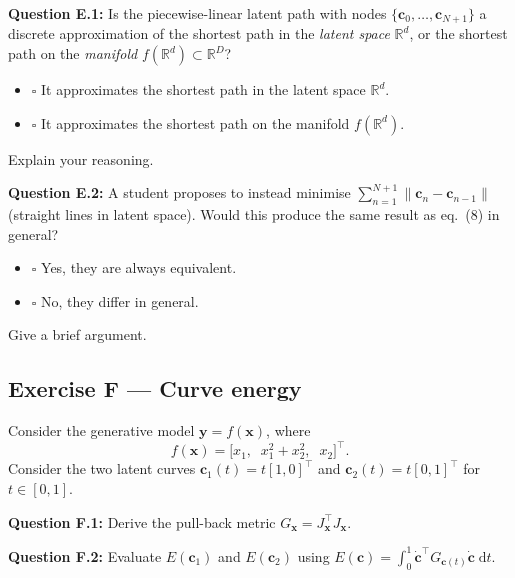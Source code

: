 \documentclass[12pt,a4paper]{article}
\begin{document}
\textbf{Question E.1:} Is the piecewise-linear latent path with nodes
$\{\mathbf{c}_0,\ldots,\mathbf{c}_{N+1}\}$ a discrete approximation of the shortest
path in the \emph{latent space} $\mathbb{R}^d$, or the shortest path on the
\emph{manifold} $f(\mathbb{R}^d)\subset\mathbb{R}^D$?

\begin{itemize}[noitemsep,label={}]
  \item[\textbf{A}] $\square$ \quad It approximates the shortest path in the latent space $\mathbb{R}^d$.
  \item[\textbf{B}] $\square$ \quad It approximates the shortest path on the manifold $f(\mathbb{R}^d)$.
\end{itemize}

Explain your reasoning.

\vspace{3cm}

\textbf{Question E.2:} A student proposes to instead minimise
$\sum_{n=1}^{N+1}\|{\mathbf{c}_n-\mathbf{c}_{n-1}}\|$ (straight lines in latent space).
Would this produce the same result as eq.~(8) in general?

\begin{itemize}[noitemsep,label={}]
  \item[\textbf{A}] $\square$ \quad Yes, they are always equivalent.
  \item[\textbf{B}] $\square$ \quad No, they differ in general.
\end{itemize}

Give a brief argument.

\vspace{3cm}

\newpage
\subsection*{Exercise F --- Curve energy}

Consider the generative model $\mathbf{y}=f(\mathbf{x})$, where
\[
  f(\mathbf{x}) = \bigl[x_1,\;\; x_1^2 + x_2^2,\;\; x_2\bigr]^\top. \tag{9}
\]
Consider the two latent curves $\mathbf{c}_1(t)=t[1,0]^\top$ and $\mathbf{c}_2(t)=t[0,1]^\top$
for $t\in[0,1]$.

\textbf{Question F.1:} Derive the pull-back metric $G_{\mathbf{x}}=J_{\mathbf{x}}^\top J_{\mathbf{x}}$.

\vspace{5cm}

\textbf{Question F.2:} Evaluate $E(\mathbf{c}_1)$ and $E(\mathbf{c}_2)$ using
$E(\mathbf{c})=\int_0^1\dot{\mathbf{c}}^\top G_{\mathbf{c}(t)}\dot{\mathbf{c}}\;\mathrm{d}t$.
\end{document}
